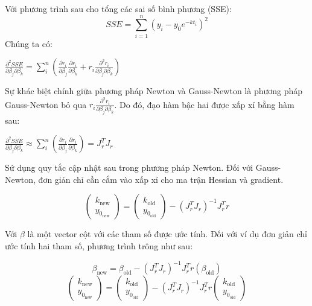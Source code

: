 \documentclass[conference]{IEEEtran}
\begin{document}
Với phương trình sau cho tổng các sai số bình phương (SSE):
\[
    SSE = \sum_{i=1}^{n} (y_i - y_0 e^{-kt_i})^2
\]
Chúng ta có:
\begin{center}
    \(
    \frac{\partial^2 {SSE}}{\partial \beta_j \partial \beta_k} = \sum_{i}^{n} \left( \frac{\partial r_i}{\partial \beta_j} \frac{\partial r_i}{\partial \beta_k} + r_i \frac{\partial^2 r_i}{\partial \beta_j \partial \beta_k} \right)
    \)
\end{center}

Sự khác biệt chính giữa phương pháp Newton và Gauss-Newton là phương pháp Gauss-Newton bỏ qua \(r_i \frac{\partial^2 r_i}{\partial \beta_j \partial \beta_k}\).
Do đó, đạo hàm bậc hai được xấp xỉ bằng hàm sau:
\begin{center}
    \(
    \frac{\partial^2 {SSE}}{\partial \beta_j \partial \beta_k} \approx \sum_{i}^{n} \left( \frac{\partial r_i}{\partial \beta_j} \frac{\partial r_i}{\partial \beta_k} \right) = J^T_r J_r
    \)
\end{center}

Sử dụng quy tắc cập nhật sau trong phương pháp Newton. Đối với Gauss-Newton, đơn giản chỉ cần cắm vào xấp xỉ cho ma trận Hessian và gradient.

\begin{center}
    \[
        \begin{pmatrix}
            k_{\text{new}} \\ y_{0_\text{new}}
        \end{pmatrix} =
        \begin{pmatrix}
            k_{\text{old}} \\ y_{0_\text{old}}
        \end{pmatrix} - (J^T_r J_r)^{-1} J^T_r r
    \]
\end{center}

Với \(\beta\) là một vector cột với các tham số được ước tính. Đối với ví dụ đơn giản chỉ ước tính hai tham số, phương trình trông như sau:

\begin{center}
    \[
        \beta_{\text{new}} = \beta_{\text{old}} - (J^T_r J_r)^{-1} J^T_r r(\beta_{\text{old}})
    \]
    \[
        \begin{pmatrix}
            k_{\text{new}} \\ y_{0_\text{new}}
        \end{pmatrix} =
        \begin{pmatrix}
            k_{\text{old}} \\ y_{0_\text{old}}
        \end{pmatrix} - (J^T_r J_r)^{-1} J^T_r r \begin{pmatrix}
            k_{\text{old}} \\ y_{0_\text{old}}
        \end{pmatrix}
    \]
\end{center}
\vspace{3mm}
\end{document}
